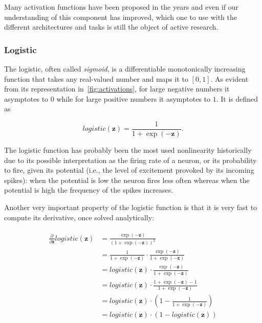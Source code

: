 Many activation functions have been proposed in the years and even if our
understanding of this component has improved, which one to use with the
different architectures and tasks is still the object of active research.

\subsubsection{Logistic}\label{sec:logistic}
The logistic, often called \emph{sigmoid}, is a differentiable monotonically
increasing function that takes any real-valued number and maps it to $[0, 1]$.
As evident from its representation in~\autoref{fig:activations}, for large
negative numbers it asymptotes to $0$ while for large positive numbers it
asymptotes to $1$. It is defined as

\begin{equation}\label{eq:logistic}
    logistic(\mathbf{z}) = \frac{1}{1+\exp(-\mathbf{z})}.
\end{equation}

\noindent The logistic function has probably been the most used nonlinearity
historically due to its possible interpretation as the firing rate of a neuron,
or its probability to fire, given its potential (i.e., the level of excitement
provoked by its incoming spikes): when the potential is low the neuron fires
less often whereas when the potential is high the frequency of the spikes
increases.

Another very important property of the logistic function is that it is very
fast to compute its derivative, once solved analytically:

\begin{align}\label{eq:logistic_derivative}
\begin{split}%
    \frac{\partial}{\partial \mathbf{z}}logistic(\mathbf{z}) &=
        \frac{\exp(\mathbf{-z})}{\left(1+\exp(-\mathbf{z})\right)^2} \\
    &= \frac{1}{1+\exp(-\mathbf{z})} \cdot
        \frac{\exp(-\mathbf{z})}{1+\exp(-\mathbf{z})} \\
    &= logistic(\mathbf{z}) \cdot
        \frac{\exp(-\mathbf{z})}{1+\exp(-\mathbf{z})} \\
    &= logistic(\mathbf{z}) \cdot
        \frac{1+\exp(-\mathbf{z})-1}{1+\exp(-\mathbf{z})} \\
    &= logistic(\mathbf{z}) \cdot
        \left(1-\frac{1}{1+\exp(-\mathbf{z})}\right) \\
    &= logistic(\mathbf{z}) \cdot (1-logistic(\mathbf{z}))
\end{split}
\end{align}

